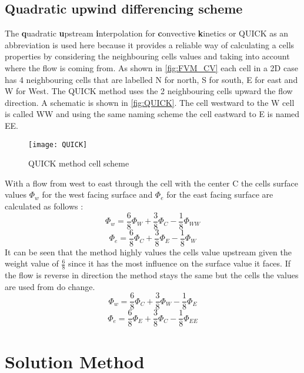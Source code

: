 \documentclass[../thesis.tex]{subfiles}
\begin{document}
\subsection{Quadratic upwind differencing scheme}
\label{sec:QUICK}
The \textbf{q}uadratic \textbf{u}pstream \textbf{i}nterpolation for \textbf{c}onvective \textbf{k}inetics \cite{versteeg2007introduction} or QUICK as an abbreviation is used here because it provides a reliable way of calculating a cells properties by considering the neighbouring cells values and taking into account where the flow is coming from.
As shown in \autoref{fig:FVM_CV} each cell in a 2D case has 4 neighbouring cells that are labelled N for north, S for south, E for east and W for West. The QUICK method uses the 2 neighbouring cells upward the flow direction. A schematic is shown in \autoref{fig:QUICK}. The cell westward to the W cell is called WW and using the same naming scheme the cell eastward to E is named EE.
\begin{figure}[htbp]
	\centering
	\texttt{[image: QUICK]}
	\caption{QUICK method cell scheme}
	\label{fig:QUICK}
\end{figure}
With a flow from west to east through the cell with the center C the cells surface values $\Phi_w$ for the west facing surface and $\Phi_e$ for the east facing surface are calculated as follows \cite{versteeg2007introduction}:
\begin{equation}
	\Phi_w = \dfrac{6}{8} \Phi_W + \dfrac{3}{8} \Phi_C - \dfrac{1}{8} \Phi_{WW}
\end{equation}
\begin{equation}
	\Phi_e = \dfrac{6}{8} \Phi_C + \dfrac{3}{8} \Phi_E - \dfrac{1}{8} \Phi_{W}
\end{equation}
It can be seen that the method highly values the cells value upstream given the weight value of $\frac{6}{8}$ since it has the most influence on the surface value it faces. If the flow is reverse in direction the method stays the same but the cells the values are used from do change.
\begin{equation}
	\Phi_w = \dfrac{6}{8} \Phi_C + \dfrac{3}{8} \Phi_W - \dfrac{1}{8} \Phi_{E}
\end{equation}
\begin{equation}
	\Phi_e = \dfrac{6}{8} \Phi_E + \dfrac{3}{8} \Phi_C - \dfrac{1}{8} \Phi_{EE}
\end{equation}

\section{Solution Method}
\label{sec:sol_method}
\end{document}
